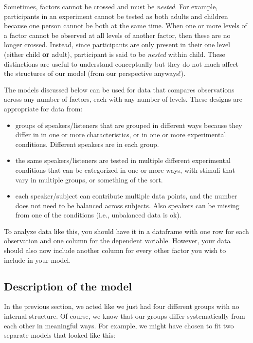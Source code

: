 \documentclass[
]{book}
\begin{document}
Sometimes, factors cannot be crossed and must be \emph{nested}. For example, participants in an experiment cannot be tested as both adults and children because one person cannot be both at the same time. When one or more levels of a factor cannot be observed at all levels of another factor, then these are no longer crossed. Instead, since participants are only present in their one level (either child \textbf{or} adult), participant is said to be \emph{nested} within child. These distinctions are useful to understand conceptually but they do not much affect the structures of our model (from our perspective anyways!).

The models discussed below can be used for data that compares observations across any number of factors, each with any number of levels. These designs are appropriate for data from:

\begin{itemize}
\item
  groups of speakers/listeners that are grouped in different ways because they differ in in one or more characteristics, or in one or more experimental conditions. Different speakers are in each group.
\item
  the same speakers/listeners are tested in multiple different experimental conditions that can be categorized in one or more ways, with stimuli that vary in multiple groups, or something of the sort.
\item
  each speaker/subject can contribute multiple data points, and the number does not need to be balanced across subjects. Also speakers can be missing from one of the conditions (i.e., unbalanced data is ok).
\end{itemize}

To analyze data like this, you should have it in a dataframe with one row for each observation and one column for the dependent variable. However, your data should also now include another column for every other factor you wish to include in your model.

\hypertarget{description-of-the-model-3}{%
\subsection{Description of the model}\label{description-of-the-model-3}}

In the previous section, we acted like we just had four different groups with no internal structure. Of course, we know that our groups differ systematically from each other in meaningful ways. For example, we might have chosen to fit two separate models that looked like this:
\end{document}
